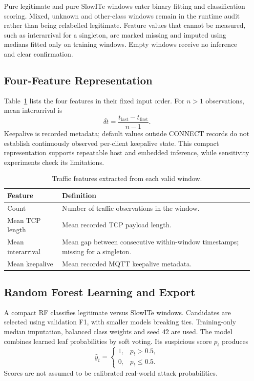 \documentclass[conference]{IEEEtran}
\begin{document}
Pure legitimate and pure SlowITe windows enter binary fitting and
classification scoring. Mixed, unknown and other-class windows remain
in the runtime audit rather than being relabelled legitimate. Feature
values that cannot be measured, such as interarrival for a singleton,
are marked missing and imputed using medians fitted only on training
windows. Empty windows receive no inference and clear confirmation.

\subsection{Four-Feature Representation}

Table~\ref{tab:features} lists the four features in their fixed input
order. For $n>1$ observations, mean interarrival is
\begin{equation}
\overline{\delta t}=
\frac{t_{\mathrm{last}}-t_{\mathrm{first}}}{n-1}.
\end{equation}
Keepalive is recorded metadata; default values outside CONNECT records
do not establish continuously observed per-client keepalive state.
This compact representation supports repeatable host and embedded
inference, while sensitivity experiments check its limitations.

\begin{table}[t]
\centering
\caption{Traffic features extracted from each valid window.}
\label{tab:features}
\begin{tabularx}{\columnwidth}{lX}
\toprule
Feature & Definition \\
\midrule
Count & Number of traffic observations in the window. \\
Mean TCP length & Mean recorded TCP payload length. \\
Mean interarrival & Mean gap between consecutive within-window timestamps; missing for a singleton. \\
Mean keepalive & Mean recorded MQTT keepalive metadata. \\
\bottomrule
\end{tabularx}
\end{table}

\subsection{Random Forest Learning and Export}

A compact RF classifies legitimate versus SlowITe windows. Candidates
are selected using validation F1, with smaller models breaking ties.
Training-only median imputation, balanced class weights and seed 42
are used. The model combines learned leaf probabilities by soft
voting. Its suspicious score $p_t$ produces
\begin{equation}
\hat y_t=\begin{cases}1,&p_t>0.5,\\0,&p_t\leq0.5.\end{cases}
\end{equation}
Scores are not assumed to be calibrated real-world attack probabilities.
\end{document}

